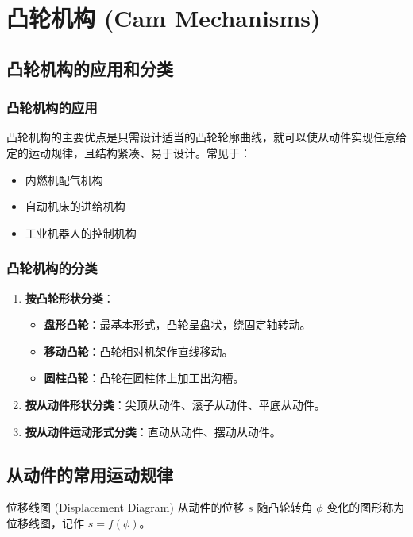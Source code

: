 \chapter{凸轮机构 (Cam Mechanisms)}


\section{凸轮机构的应用和分类}

\subsection{凸轮机构的应用}
凸轮机构的主要优点是只需设计适当的凸轮轮廓曲线，就可以使从动件实现任意给定的运动规律，且结构紧凑、易于设计。常见于：
\begin{itemize}
	\item 内燃机配气机构
	\item 自动机床的进给机构
	\item 工业机器人的控制机构
\end{itemize}

\subsection{凸轮机构的分类}

\begin{enumerate}
	\item \textbf{按凸轮形状分类}：
	\begin{itemize}
		\item \textbf{盘形凸轮}：最基本形式，凸轮呈盘状，绕固定轴转动。
		\item \textbf{移动凸轮}：凸轮相对机架作直线移动。
		\item \textbf{圆柱凸轮}：凸轮在圆柱体上加工出沟槽。
	\end{itemize}
	\item \textbf{按从动件形状分类}：尖顶从动件、滚子从动件、平底从动件。
	\item \textbf{按从动件运动形式分类}：直动从动件、摆动从动件。
\end{enumerate}

\section{从动件的常用运动规律}

\begin{definition}{位移线图 (Displacement Diagram)}
	从动件的位移 $s$ 随凸轮转角 $\phi$ 变化的图形称为位移线图，记作 $s = f(\phi)$。
\end{definition}

